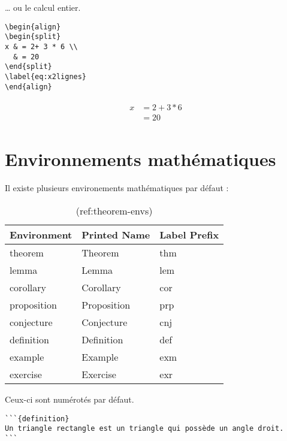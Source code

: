 \documentclass[]{book}
\theoremstyle{definition}
\theoremstyle{definition}
\theoremstyle{definition}
\theoremstyle{remark}
\begin{document}
\ldots{} ou le calcul entier.

\begin{verbatim}
\begin{align}
\begin{split}
x & = 2+ 3 * 6 \\
  & = 20
\end{split}
\label{eq:x2lignes}
\end{align}
\end{verbatim}

\begin{align}
\begin{split}
x & = 2+ 3 * 6 \\
  & = 20
\end{split}
\label{eq:x2lignes}
\end{align}

\hypertarget{environnements-mathematiques}{%
\section{Environnements mathématiques}\label{environnements-mathematiques}}

Il existe plusieurs environements mathématiques par défaut :

\begin{table}[t]

\caption{\label{tab:theorem-envs}(ref:theorem-envs)}
\centering
\begin{tabular}{lll}
\toprule
Environment & Printed Name & Label Prefix\\
\midrule
theorem & Theorem & thm\\
lemma & Lemma & lem\\
corollary & Corollary & cor\\
proposition & Proposition & prp\\
conjecture & Conjecture & cnj\\
\addlinespace
definition & Definition & def\\
example & Example & exm\\
exercise & Exercise & exr\\
\bottomrule
\end{tabular}
\end{table}

Ceux-ci sont numérotés par défaut.

\begin{verbatim}
```{definition}
Un triangle rectangle est un triangle qui possède un angle droit.
```
\end{verbatim}
\end{document}
